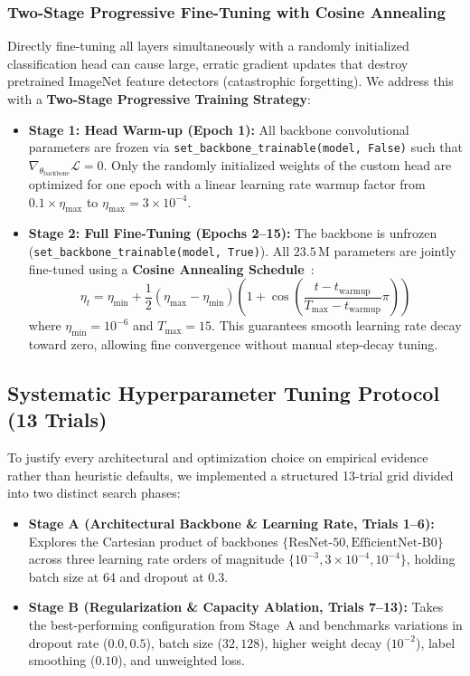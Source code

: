\subsubsection{Two-Stage Progressive Fine-Tuning with Cosine Annealing}
Directly fine-tuning all layers simultaneously with a randomly initialized classification head can cause large, erratic gradient updates that destroy pretrained ImageNet feature detectors (catastrophic forgetting). We address this with a \textbf{Two-Stage Progressive Training Strategy}:

\begin{itemize}[leftmargin=*]
    \item \textbf{Stage 1: Head Warm-up (Epoch 1):} All backbone convolutional parameters are frozen via \texttt{set\_backbone\_trainable(model, False)} such that $\nabla_{\theta_{\text{backbone}}} \mathcal{L} = 0$. Only the randomly initialized weights of the custom head are optimized for one epoch with a linear learning rate warmup factor from $0.1 \times \eta_{\max}$ to $\eta_{\max} = 3 \times 10^{-4}$.
    \item \textbf{Stage 2: Full Fine-Tuning (Epochs 2--15):} The backbone is unfrozen (\texttt{set\_backbone\_trainable(model, True)}). All $23.5$\,M parameters are jointly fine-tuned using a \textbf{Cosine Annealing Schedule}~\cite{cosine_annealing}:
    \begin{equation}
        \eta_t = \eta_{\min} + \frac{1}{2}(\eta_{\max} - \eta_{\min})\left(1 + \cos\left(\frac{t - t_{\text{warmup}}}{T_{\text{max}} - t_{\text{warmup}}}\pi\right)\right)
    \end{equation}
    where $\eta_{\min} = 10^{-6}$ and $T_{\text{max}} = 15$. This guarantees smooth learning rate decay toward zero, allowing fine convergence without manual step-decay tuning.
\end{itemize}

\subsection{Systematic Hyperparameter Tuning Protocol (13 Trials)}
\label{subsec:hyperparameter_tuning}

To justify every architectural and optimization choice on empirical evidence rather than heuristic defaults, we implemented a structured 13-trial grid divided into two distinct search phases:

\begin{itemize}[leftmargin=*]
    \item \textbf{Stage A (Architectural Backbone \& Learning Rate, Trials 1--6):} Explores the Cartesian product of backbones $\{\text{ResNet-50}, \text{EfficientNet-B0}\}$ across three learning rate orders of magnitude $\{10^{-3}, 3\times 10^{-4}, 10^{-4}\}$, holding batch size at 64 and dropout at 0.3.
    \item \textbf{Stage B (Regularization \& Capacity Ablation, Trials 7--13):} Takes the best-performing configuration from Stage~A and benchmarks variations in dropout rate ($0.0, 0.5$), batch size ($32, 128$), higher weight decay ($10^{-2}$), label smoothing ($0.10$), and unweighted loss.
\end{itemize}


